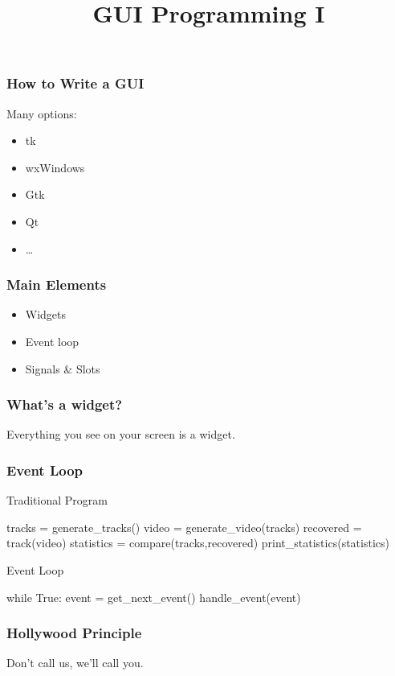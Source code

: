 
\title{GUI Programming I}

\frame{\maketitle}

\begin{frame}[fragile]
\frametitle{How to Write a GUI}
Many options:
\begin{itemize}
\item tk
\item wxWindows
\item Gtk
\item \alert<2>{Qt}
\item \ldots
\end{itemize}
\end{frame}

\begin{frame}[fragile]
\frametitle{Main Elements}
\begin{itemize}
\item Widgets
\item Event loop
\item Signals \& Slots
\end{itemize}
\end{frame}

\begin{frame}[fragile]
\frametitle{What's a widget?}
Everything you see on your screen is a widget.
\end{frame}


\begin{frame}[fragile]
\frametitle{Event Loop}
\begin{block}{Traditional Program}
\begin{python}
tracks = generate_tracks()
video = generate_video(tracks)
recovered = track(video)
statistics = compare(tracks,recovered)
print_statistics(statistics)
\end{python}
\end{block}

\begin{block}{Event Loop}
\begin{python}
while True:
    event = get_next_event()
    handle_event(event)
\end{python}
\end{block}
\end{frame}

\begin{frame}[fragile]
\frametitle{Hollywood Principle}
Don't call us, we'll call you.
\end{frame}

